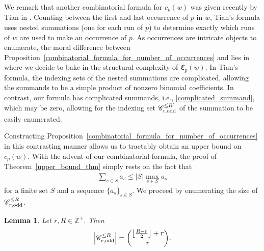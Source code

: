 \documentclass[11pt]{amsart}
\newtheorem{lemma}[theorem]{Lemma}
\newcommand{\ZZ}{\mathbb{Z}}
\begin{document}
We remark that another combinatorial formula for $c_p(w)$ was given recently by Tian in \cite[Theorem 4.0.6]{other_formula_for_occurrence_count}. Counting between the first and last occurrence of $p$ in $w$, Tian's formula uses nested summations (one for each run of $p$) to determine exactly which runs of $w$ are used to make an occurrence of $p$. As occurrences are intricate objects to enumerate, the moral difference between Proposition~\ref{combinatorial_formula_for_number_of_occurrences} and \cite[Theorem 4.0.6]{other_formula_for_occurrence_count} lies in where we decide to bake in the structural complexity of $\mathfrak{C}_p(w)$. In Tian's formula, the indexing sets of the nested summations are complicated, allowing the summands to be a simple product of nonzero binomial coefficients. In contrast, our formula has complicated summands, i.e., \eqref{complicated_summand}, which may be zero, allowing for the indexing set $\mathscr{C}_{r,\text{\normalfont odd}}^{\leq R'}$ of the summation to be easily enumerated.

Constructing Proposition~\ref{combinatorial_formula_for_number_of_occurrences} in this contrasting manner allows us to tractably obtain an upper bound on $c_p(w)$. With the advent of our combinatorial formula, the proof of Theorem~\ref{upper_bound_thm} simply rests on the fact that
\begin{align*}
    \sum_{s\in S}a_s\leq |S|\max_{s\in S}a_s
\end{align*}
for a finite set $S$ and a sequence $\{a_s\}_{s\in S}$. We proceed by enumerating the size of $\mathscr{C}_{r,\text{\normalfont odd}}^{\leq R}$.

\begin{lemma}\label{enumeration_of_comps}
    Let $r,R\in\ZZ^+$. Then
    \begin{align*}
        \left|\mathscr{C}_{r,\text{\normalfont odd}}^{\leq R}\right|={\left\lfloor\frac{R-r}{2}\right\rfloor+r\choose r}.
    \end{align*}
\end{lemma}

\end{document}
